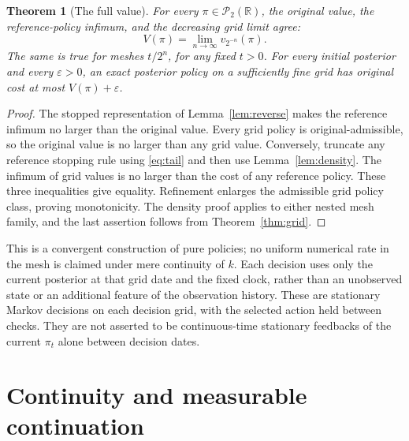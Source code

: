 \documentclass[11pt,a4paper]{article}
\newtheorem{theorem}{Theorem}[section]
\theoremstyle{definition}
\theoremstyle{remark}
\newcommand{\R}{\mathbb R}
\newcommand{\Ptwo}{\mathcal P_2(\R)}
\begin{document}
\begin{theorem}[The full value]\label{thm:value}
For every \(\pi\in\Ptwo\), the original value, the reference-policy
infimum, and the decreasing grid limit agree:
\begin{equation}\label{eq:Vlimit}
 V(\pi)=\lim_{n\to\infty}v_{2^{-n}}(\pi).
\end{equation}
The same is true for meshes \(t/2^n\), for any fixed \(t>0\).
For every initial posterior and every \(\varepsilon>0\), an exact
posterior policy on a sufficiently fine grid has original cost
at most \(V(\pi)+\varepsilon\).
\end{theorem}
\begin{proof}
The stopped representation of Lemma~\ref{lem:reverse} makes the
reference infimum no larger than the original value.
Every grid policy is original-admissible, so the original value
is no larger than any grid value. Conversely, truncate any
reference stopping rule using \eqref{eq:tail} and then use
Lemma~\ref{lem:density}. The infimum of grid values is no larger
than the cost of any reference policy. These three inequalities
give equality. Refinement enlarges the admissible grid policy
class, proving monotonicity. The density proof applies to either
nested mesh family, and the last assertion follows from
Theorem~\ref{thm:grid}.
\end{proof}

This is a convergent construction of pure policies; no uniform
numerical rate in the mesh is claimed under mere continuity of
\(k\). Each decision uses only the current posterior at that grid
date and the fixed clock, rather than an unobserved state or an
additional feature of the observation history.
These are stationary Markov decisions on each decision grid,
with the selected action held between checks. They are not asserted
to be continuous-time stationary feedbacks of the current
\(\pi_t\) alone between decision dates.

\section{Continuity and measurable continuation}
\end{document}
